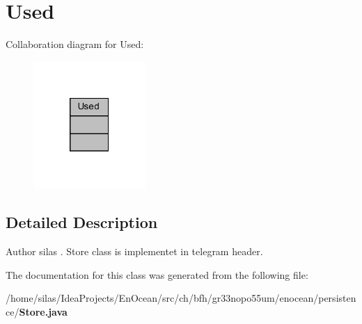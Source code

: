 \section{Used}
\label{classUsed}


Collaboration diagram for Used\+:\nopagebreak
\begin{figure}[H]
\begin{center}
\leavevmode
\includegraphics[width=121pt]{d1/db1/classUsed__coll__graph}
\end{center}
\end{figure}


\subsection{Detailed Description}
\begin{DoxyAuthor}{Author}
silas . Store class is implementet in telegram header. 
\end{DoxyAuthor}


The documentation for this class was generated from the following file\+:\begin{DoxyCompactItemize}
\item 
/home/silas/\+Idea\+Projects/\+En\+Ocean/src/ch/bfh/gr33nopo55um/enocean/persistence/{\bf Store.\+java}\end{DoxyCompactItemize}
